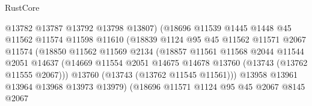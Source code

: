 \begin{lexlean}{RustCore}
\begin{coremodule}
                                    @13782
                                    @13787
                                    @13792
                                    @13798
                                    @13807)
                                  (@18696
                                    @11539
                                    @1445
                                    @1448
                                    @45
                                    @11562
                                    @11574
                                    @11598
                                    @11610
                                    (@18839
                                      @1124
                                      @95
                                      @45
                                      @11562
                                      @11571
                                      @2067
                                      @11574
                                      (@18850
                                        @11562
                                        @11569
                                        @2134
                                        (@18857
                                          @11561
                                          @11568
                                          @2044
                                          @11544
                                          @2051
                                          @14637
                                          (@14669
                                            @11554
                                            @2051
                                            @14675
                                            @14678
                                            @13760
                                            (@13743 (@13762 @11555 @2067)))
                                          @13760
                                          (@13743 (@13762 @11545 @11561)))
                                        @13958
                                        @13961
                                        @13964
                                        @13968
                                        @13973
                                        @13979)
                                      (@18696
                                        @11571
                                        @1124
                                        @95
                                        @45
                                        @2067
                                        @8145
                                        @2067

\end{coremodule}
\end{lexlean}
